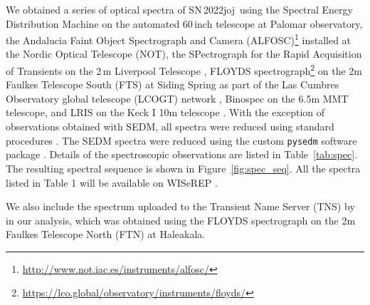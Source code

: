 \documentclass[twocolumn]{aastex631}
\newcommand{\sn}{SN\,2022joj}
\begin{document}
\begin{CJK*}{UTF8}{gbsn}
We obtained a series of optical spectra of \sn\ using the Spectral Energy Distribution Machine \citep[SEDM;][]{SEDM_2018} on the automated 60\,inch telescope \citep[P60;][]{P60_2006} at Palomar observatory, the Andalucia Faint Object Spectrograph and Camera (ALFOSC)\footnote{\url{http://www.not.iac.es/instruments/alfosc/}} installed at the Nordic Optical Telescope (NOT), the SPectrograph for the Rapid Acquisition of Transients \citep[SPRAT;][]{SPRAT_2014} on the 2\,m Liverpool Telescope \citep[LT;][]{LT_2004}, FLOYDS spectrograph\footnote{\url{https://lco.global/observatory/instruments/floyds/}} on the 2m Faulkes Telescope South (FTS) at Siding Spring as part of the Las Cumbres Observatory global telescope (LCOGT) network \citep{LCOGT_2013}, Binospec \citep{Binospec_2019} on the 6.5m MMT telescope, and LRIS on the Keck I 10m telescope \citep{Keck_1995}. With the exception of observations obtained with SEDM, all spectra were reduced using standard procedures \citep[e.g.,][]{Matheson_2000}. The SEDM spectra were reduced using the custom \texttt{pysedm} software package \citep{Rigault_pysedm_2019}. Details of the spectroscopic observations are listed in Table~\ref{tab:spec}. The resulting spectral sequence is shown in Figure~\ref{fig:spec_seq}. All the spectra listed in Table 1 will be available on WISeREP \citep{wiserep_2012}.

We also include the spectrum uploaded to the Transient Name Server (TNS) by \citet{Newsome_2022TNSCR} in our analysis, which was obtained using the FLOYDS spectrograph on the 2m Faulkes Telescope North (FTN) at Haleakala.


\end{CJK*}
\end{document}
